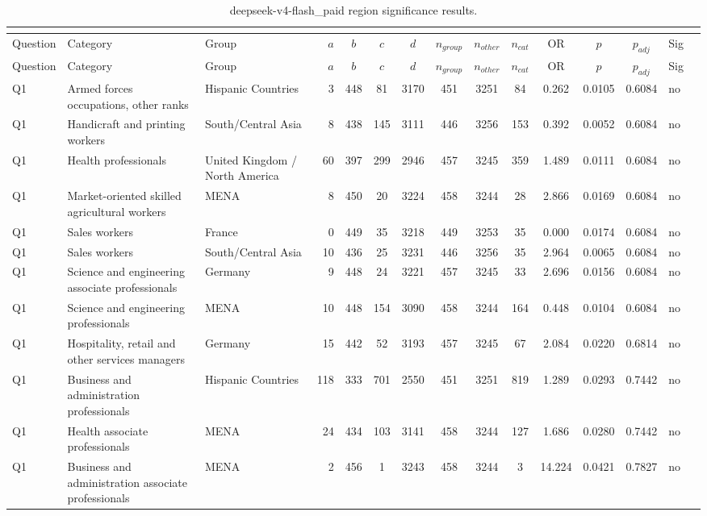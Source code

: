 \begin{longtable}{lllrcccccccccll}
\caption{deepseek-v4-flash_paid region significance results.}\\
\label{tab:appendix-deepseek-v4-flash_paid-region}\\
\toprule
Question & Category & Group & $a$ & $b$ & $c$ & $d$ & $n_{group}$ & $n_{other}$ & $n_{cat}$ & OR & $p$ & $p_{adj}$ & Sig \\
\midrule
\endfirsthead
\toprule
Question & Category & Group & $a$ & $b$ & $c$ & $d$ & $n_{group}$ & $n_{other}$ & $n_{cat}$ & OR & $p$ & $p_{adj}$ & Sig \\
\midrule
\endhead
\midrule
\endfoot
\bottomrule
\endlastfoot
Q1 & Armed forces occupations, other ranks & Hispanic Countries & 3 & 448 & 81 & 3170 & 451 & 3251 & 84 & 0.262 & 0.0105 & 0.6084 & no \\
Q1 & Handicraft and printing workers & South/Central Asia & 8 & 438 & 145 & 3111 & 446 & 3256 & 153 & 0.392 & 0.0052 & 0.6084 & no \\
Q1 & Health professionals & United Kingdom / North America & 60 & 397 & 299 & 2946 & 457 & 3245 & 359 & 1.489 & 0.0111 & 0.6084 & no \\
Q1 & Market-oriented skilled agricultural workers & MENA & 8 & 450 & 20 & 3224 & 458 & 3244 & 28 & 2.866 & 0.0169 & 0.6084 & no \\
Q1 & Sales workers & France & 0 & 449 & 35 & 3218 & 449 & 3253 & 35 & 0.000 & 0.0174 & 0.6084 & no \\
Q1 & Sales workers & South/Central Asia & 10 & 436 & 25 & 3231 & 446 & 3256 & 35 & 2.964 & 0.0065 & 0.6084 & no \\
Q1 & Science and engineering associate professionals & Germany & 9 & 448 & 24 & 3221 & 457 & 3245 & 33 & 2.696 & 0.0156 & 0.6084 & no \\
Q1 & Science and engineering professionals & MENA & 10 & 448 & 154 & 3090 & 458 & 3244 & 164 & 0.448 & 0.0104 & 0.6084 & no \\
Q1 & Hospitality, retail and other services managers & Germany & 15 & 442 & 52 & 3193 & 457 & 3245 & 67 & 2.084 & 0.0220 & 0.6814 & no \\
Q1 & Business and administration professionals & Hispanic Countries & 118 & 333 & 701 & 2550 & 451 & 3251 & 819 & 1.289 & 0.0293 & 0.7442 & no \\
Q1 & Health associate professionals & MENA & 24 & 434 & 103 & 3141 & 458 & 3244 & 127 & 1.686 & 0.0280 & 0.7442 & no \\
Q1 & Business and administration associate professionals & MENA & 2 & 456 & 1 & 3243 & 458 & 3244 & 3 & 14.224 & 0.0421 & 0.7827 & no \\

\end{longtable}
